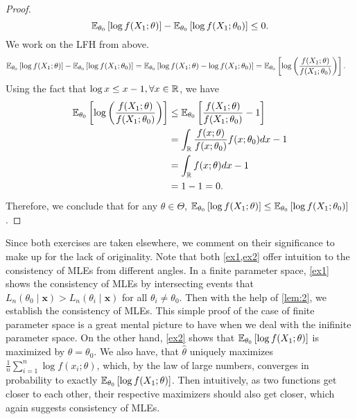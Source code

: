 \begin{enumerate}
\begin{proof}
\[
\mathbb{E}_{\theta_0}\left[ \log f(X_1;\theta) \right] - \mathbb{E}_{\theta_0}\left[ \log f(X_1;\theta_0) \right] \leq 0.
\]
We work on the LFH from above.
\begin{align*}
\mathbb{E}_{\theta_0}\left[ \log f(X_1;\theta) \right] - \mathbb{E}_{\theta_0}\left[ \log f(X_1;\theta_0) \right] &= \mathbb{E}_{\theta_0}\left[ \log f(X_1;\theta) - \log f(X_1;\theta_0) \right]
= \mathbb{E}_{\theta_0}\left[ \log \left(\frac{f(X_1;\theta)}{f(X_1;\theta_0)}\right) \right].
\end{align*}
Using the fact that $\log x \leq x-1,\forall x\in\mathbb{R}$, we have
\begin{align*}
\mathbb{E}_{\theta_0}\left[ \log \left(\frac{f(X_1;\theta)}{f(X_1;\theta_0)}\right) \right] &\leq \mathbb{E}_{\theta_0}\left[ \frac{f(X_1;\theta)}{f(X_1;\theta_0)} - 1 \right]\\
&= \int_{\mathbb{R}} \frac{f(x;\theta)}{f(x;\theta_0)}f(x;\theta_0)dx - 1\\
&= \int_{\mathbb{R}} f(x;\theta)dx -1\\
&= 1 - 1 = 0.
\end{align*}
Therefore, we conclude that for any $\theta\in\Theta$, $\mathbb{E}_{\theta_0}\left[ \log f(X_1;\theta) \right] \leq \mathbb{E}_{\theta_0}\left[ \log f(X_1;\theta_0) \right]$.
\end{proof}
\end{enumerate}
Since both exercises are taken elsewhere, we comment on their significance to make up for the lack of originality. Note that both \cref{ex1,ex2} offer intuition to the consistency of MLEs from different angles. In a finite parameter space, \cref{ex1} shows the consistency of MLEs by intersecting events that $L_n(\theta_0\mid\bm{x}) > L_n(\theta_i\mid\bm{x})$ for all $\theta_i\neq\theta_0$. Then with the help of \cref{lem:2}, we establish the consistency of MLEs. This simple proof of the case of finite parameter space is a great mental picture to have when we deal with the inifinite parameter space. On the other hand, \cref{ex2} shows that $\mathbb{E}_{\theta_0}\left[ \log f(X_1;\theta) \right]$ is maximized by $\theta=\theta_0$. We also have, that $\hat{\theta}$ uniquely maximizes $\frac{1}{n}\sum_{i=1}^n \log f(x_i;\theta)$, which, by the law of large numbers, converges in probability to exactly $\mathbb{E}_{\theta_0}\left[ \log f(X_1;\theta) \right]$. Then intuitively, as two functions get closer to each other, their respective maximizers should also get closer, which again suggests consistency of MLEs.
